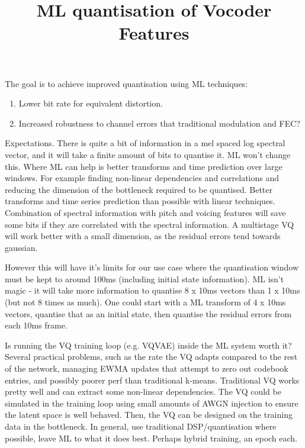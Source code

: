 \documentclass{article}
\begin{document}
\title{ML quantisation of Vocoder Features}
\maketitle

The goal is to achieve improved quantisation using ML techniques:
\begin{enumerate}
\item Lower bit rate for equivalent distortion.  
\item Increased robustness to channel errors that traditional modulation and FEC?
\end{enumerate}

Expectations.  There is quite a bit of information in a mel spaced log spectral vector, and it will take a finite amount of bits to quantise it.  ML won't change this. Where ML can help is better transforms and time prediction over large windows.  For example finding non-linear dependencies and correlations and reducing the dimension of the bottleneck required to be quantised.  Better transforms and time series prediction than possible with linear techniques. Combination of spectral information with pitch and voicing features will save some bits if they are correlated with the spectral information.  A multistage VQ will work better with a small dimension, as the residual errors tend towards gaussian.

However this will have it's limits for our use case where the quantisation window must be kept to around 100ms (including initial state information). ML isn't magic - it will take more information to quantise 8 x 10ms vectors than 1 x 10ms (but not 8 times as much).  One could start with a ML transform of 4 x 10ms vectors, quantise that as an initial state, then quantise the residual errors from each 10ms frame.

Is running the VQ training loop (e.g. VQVAE) inside the ML system worth it?  Several practical problems, such as the rate the VQ adapts compared to the rest of the network, managing EWMA updates that attempt to zero out codebook entries, and possibly poorer perf than traditional k-means.  Traditional VQ works pretty well and can extract some non-linear dependencies. The VQ could be simulated in the training loop using small amounts of AWGN injection to ensure the latent space is well behaved. Then, the VQ can be designed on the training data in the bottleneck. In general, use traditional DSP/quantisation where possible, leave ML to what it does best.  Perhaps hybrid training, an epoch each.
\end{document}
